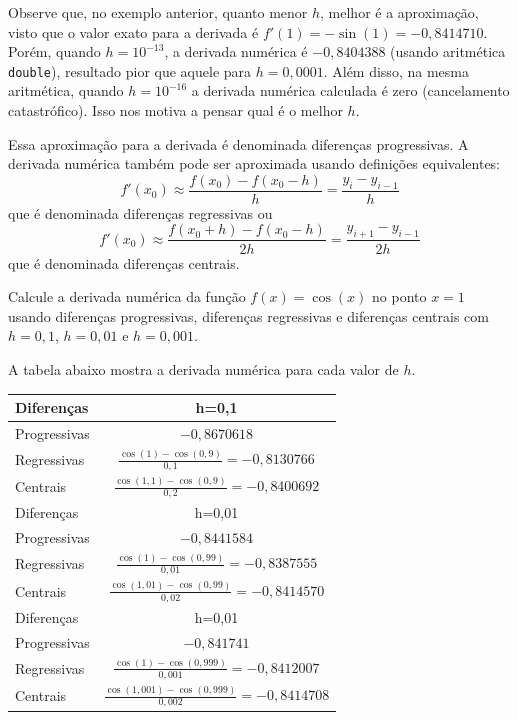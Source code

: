 Observe que, no exemplo anterior, quanto menor $h$, melhor é a aproximação, visto que o valor exato para a derivada é $f'(1)=-\sin(1)=-0,8414710$. Porém, quando $h=10^{-13}$, a derivada numérica é $-0,8404388$ (usando aritmética \verb+double+), resultado pior que aquele para $h=0,0001$. Além disso, na mesma aritmética, quando $h=10^{-16}$ a derivada numérica calculada é zero (cancelamento catastrófico). Isso nos motiva a pensar qual é o melhor $h$.  

Essa aproximação para a derivada é denominada diferenças progressivas. A derivada numérica também pode ser aproximada usando definições equivalentes:
$$
f'(x_0)\approx \frac{f(x_0)-f(x_0-h)}{h}=\frac{y_i-y_{i-1}}{h}
$$
que é denominada diferenças regressivas ou
$$
f'(x_0)\approx \frac{f(x_0+h)-f(x_0-h)}{2h}=\frac{y_{i+1}-y_{i-1}}{2h}
$$
que é denominada diferenças centrais.
\begin{ex}
Calcule a derivada numérica da função $f(x)=\cos(x)$ no ponto $x=1$ usando diferenças progressivas, diferenças regressivas e diferenças centrais com $h=0,1$, $h=0,01$ e $h=0,001$.
\end{ex}
\begin{sol}
A tabela abaixo mostra a derivada numérica para cada valor de $h$.
\begin{center}
\begin{tabular}{|l|c|} \hline
  Diferenças & h=0,1 \\ \hline
  Progressivas & $\displaystyle -0,8670618$ \\
  Regressivas  & $\displaystyle \frac{\cos(1)-\cos(0,9)}{0,1} = -0,8130766$ \\
  Centrais     & $\displaystyle \frac{\cos(1,1)-\cos(0,9)}{0,2} = -0,8400692$ \\ \hline
  Diferenças & h=0,01 \\ \hline
  Progressivas & $\displaystyle -0,8441584$ \\
  Regressivas  & $\displaystyle \frac{\cos(1)-\cos(0,99)}{0,01} = -0,8387555$ \\
  Centrais     & $\displaystyle \frac{\cos(1,01)-\cos(0,99)}{0,02} = -0,8414570$ \\ \hline
  Diferenças & h=0,01 \\ \hline
  Progressivas & $\displaystyle -0,841741$ \\
  Regressivas  & $\displaystyle \frac{\cos(1)-\cos(0,999)}{0,001} = -0,8412007$ \\
  Centrais     & $\displaystyle \frac{\cos(1,001)-\cos(0,999)}{0,002} = -0,8414708$ \\ \hline
\end{tabular}  
\end{center}  
\end{sol}


